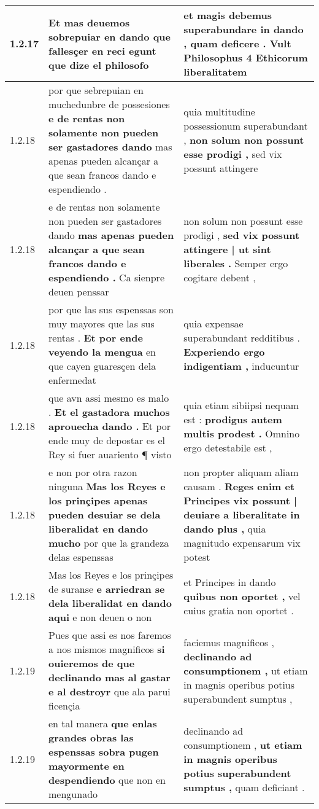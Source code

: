 \begin{tabular}{|p{1cm}|p{6.5cm}|p{6.5cm}|}
1.2.17 & Et mas deuemos sobrepuiar en \textbf{ dando que fallesçer en reci } egunt que dize el philosofo & et magis debemus superabundare in dando , \textbf{ quam deficere . } Vult Philosophus 4 Ethicorum liberalitatem \\\hline
1.2.18 & por que sebrepuian en muchedunbre de possesiones \textbf{ e de rentas non solamente non pueden ser gastadores dando } mas apenas pueden alcançar a que sean francos dando e espendiendo . & quia multitudine possessionum superabundant , \textbf{ non solum non possunt esse prodigi , } sed vix possunt attingere \\\hline
1.2.18 & e de rentas non solamente non pueden ser gastadores dando \textbf{ mas apenas pueden alcançar a que sean francos dando e espendiendo . } Ca sienpre deuen penssar & non solum non possunt esse prodigi , \textbf{ sed vix possunt attingere | ut sint liberales . } Semper ergo cogitare debent , \\\hline
1.2.18 & por que las sus espenssas son muy mayores que las sus rentas . \textbf{ Et por ende veyendo la mengua } en que cayen guaresçen dela enfermedat & quia expensae superabundant redditibus . \textbf{ Experiendo ergo indigentiam , } inducuntur \\\hline
1.2.18 & que avn assi mesmo es malo . \textbf{ Et el gastadora muchos aprouecha dando . } Et por ende muy de depostar es el Rey si fuer auariento ¶ visto & quia etiam sibiipsi nequam est : \textbf{ prodigus autem multis prodest . } Omnino ergo detestabile est , \\\hline
1.2.18 & e non por otra razon ninguna \textbf{ Mas los Reyes e los prinçipes apenas pueden desuiar se dela liberalidat en dando mucho } por que la grandeza delas espenssas & non propter aliquam aliam causam . \textbf{ Reges enim et Principes vix possunt | deuiare a liberalitate in dando plus , } quia magnitudo expensarum vix potest \\\hline
1.2.18 & Mas los Reyes e los prinçipes de suranse \textbf{ e arriedran se dela liberalidat en dando aqui } e non deuen o non & et Principes in dando \textbf{ quibus non oportet , } vel cuius gratia non oportet . \\\hline
1.2.19 & Pues que assi es nos faremos a nos mismos magnificos \textbf{ si ouieremos de que declinando mas al gastar e al destroyr } que ala parui ficençia & faciemus magnificos , \textbf{ declinando ad consumptionem , } ut etiam in magnis operibus potius superabundent sumptus , \\\hline
1.2.19 & en tal manera \textbf{ que enlas grandes obras las espenssas sobra pugen mayormente en despendiendo } que non en mengunado & declinando ad consumptionem , \textbf{ ut etiam in magnis operibus potius superabundent sumptus , } quam deficiant . \\\hline

\end{tabular}
